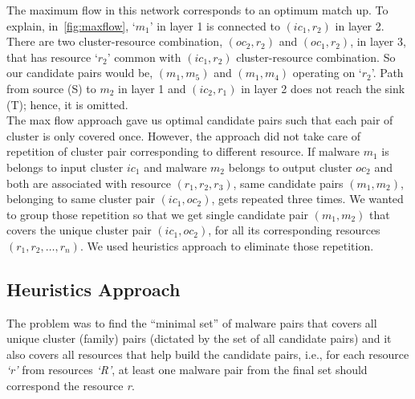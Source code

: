 The maximum flow in this network corresponds to an optimum match up.
To explain, in~\autoref{fig:maxflow}, `$m_1$' in layer 1 is connected to $(ic_1,r_2)$ in layer 2.
There are two cluster-resource combination, $(oc_2,r_2)$ and $(oc_1,r_2)$, in layer 3, that has resource `$r_2$' common with $(ic_1,r_2)$ cluster-resource combination.
So our candidate pairs would be, $(m_1,m_5)$ and $(m_1,m_4)$ operating on `$r_2$'.
Path from source (S) to $m_2$ in layer 1 and $(ic_2,r_1)$ in layer 2 does not reach the sink (T); hence, it is omitted.\\

The max flow approach gave us optimal candidate pairs such that each pair of cluster is only covered once.
However, the approach did not take care of repetition of cluster pair corresponding to different resource.
If malware $m_1$ is belongs to input cluster $ic_1$ and malware $m_2$ belongs to output cluster $oc_2$ and both are associated with resource $(r_1,r_2,r_3)$, same candidate pairs $(m_1,m_2)$, belonging to same cluster pair $(ic_1,oc_2)$, gets repeated three times.
We wanted to group those repetition so that we get single candidate pair $(m_1,m_2)$ that covers the unique cluster pair $(ic_1,oc_2)$, for all its corresponding resources $(r_1,r_2,\ldots,r_n)$.
We used heuristics approach to eliminate those repetition.
\subsection{Heuristics Approach}
\label{sub:Heuristics Approach}
The problem was to find the ``minimal set'' of malware pairs that covers all unique cluster (family) pairs (dictated by the set of all candidate pairs) and it also covers all resources that help build the candidate pairs, i.e., for each resource \emph{`r'} from resources \emph{`R'}, at least one malware pair from the final set should correspond the resource \emph{r}.\\

